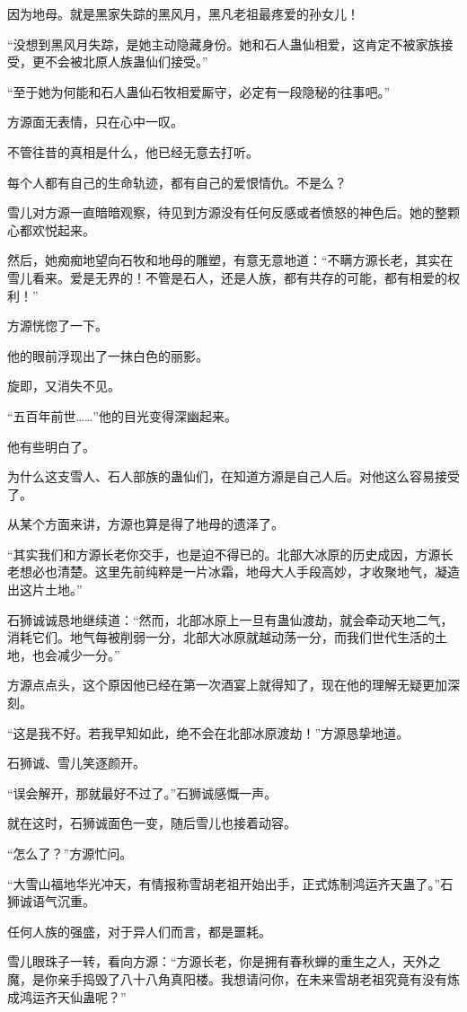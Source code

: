 \begin{this_body}
因为地母。就是黑家失踪的黑风月，黑凡老祖最疼爱的孙女儿！

“没想到黑风月失踪，是她主动隐藏身份。她和石人蛊仙相爱，这肯定不被家族接受，更不会被北原人族蛊仙们接受。”

“至于她为何能和石人蛊仙石牧相爱厮守，必定有一段隐秘的往事吧。”

方源面无表情，只在心中一叹。

不管往昔的真相是什么，他已经无意去打听。

每个人都有自己的生命轨迹，都有自己的爱恨情仇。不是么？

雪儿对方源一直暗暗观察，待见到方源没有任何反感或者愤怒的神色后。她的整颗心都欢悦起来。

然后，她痴痴地望向石牧和地母的雕塑，有意无意地道：“不瞒方源长老，其实在雪儿看来。爱是无界的！不管是石人，还是人族，都有共存的可能，都有相爱的权利！”

方源恍惚了一下。

他的眼前浮现出了一抹白色的丽影。

旋即，又消失不见。

“五百年前世……”他的目光变得深幽起来。

他有些明白了。

为什么这支雪人、石人部族的蛊仙们，在知道方源是自己人后。对他这么容易接受了。

从某个方面来讲，方源也算是得了地母的遗泽了。

“其实我们和方源长老你交手，也是迫不得已的。北部大冰原的历史成因，方源长老想必也清楚。这里先前纯粹是一片冰霜，地母大人手段高妙，才收聚地气，凝造出这片土地。”

石狮诚诚恳地继续道：“然而，北部冰原上一旦有蛊仙渡劫，就会牵动天地二气，消耗它们。地气每被削弱一分，北部大冰原就越动荡一分，而我们世代生活的土地，也会减少一分。”

方源点点头，这个原因他已经在第一次酒宴上就得知了，现在他的理解无疑更加深刻。

“这是我不好。若我早知如此，绝不会在北部冰原渡劫！”方源恳挚地道。

石狮诚、雪儿笑逐颜开。

“误会解开，那就最好不过了。”石狮诚感慨一声。

就在这时，石狮诚面色一变，随后雪儿也接着动容。

“怎么了？”方源忙问。

“大雪山福地华光冲天，有情报称雪胡老祖开始出手，正式炼制鸿运齐天蛊了。”石狮诚语气沉重。

任何人族的强盛，对于异人们而言，都是噩耗。

雪儿眼珠子一转，看向方源：“方源长老，你是拥有春秋蝉的重生之人，天外之魔，是你亲手捣毁了八十八角真阳楼。我想请问你，在未来雪胡老祖究竟有没有炼成鸿运齐天仙蛊呢？”

\end{this_body}

